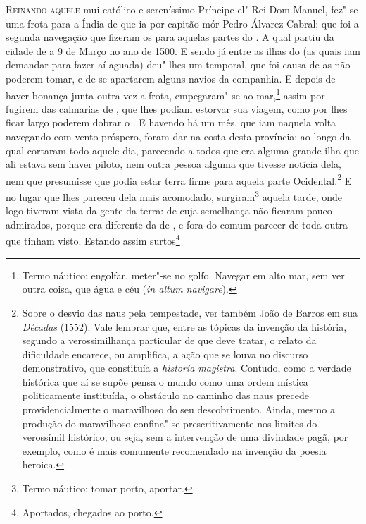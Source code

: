 \noindent\textsc{Reinando aquele} mui católico e sereníssimo Príncipe el"-Rei Dom Manuel,     
fez"-se uma frota para a Índia de que ia por capitão mór Pedro Álvarez Cabral; 	        %
que foi a segunda navegação que fizeram os  para
aquelas partes do . A qual partiu da cidade de  a 9 de Março no
ano de 1500. E sendo já entre as ilhas do  (as quais iam
demandar para fazer aí aguada) deu"-lhes um temporal, que foi				%
causa de as não poderem tomar, e de se apartarem alguns navios da
companhia. E depois de haver bonança junta outra vez a frota,					
empegaram"-se ao mar,\footnote{ Termo náutico: engolfar,  meter"-se no
golfo. Navegar em alto mar, sem ver outra coisa, que água e céu
(\textit{in altum navigare}).} assim por fugirem das calmarias de ,		%
que lhes podiam estorvar sua viagem, como por lhes ficar largo poderem
dobrar o . E havendo há um mês, que iam naquela
volta navegando com vento próspero, foram dar na costa desta província;				%
ao longo da qual cortaram todo aquele dia, parecendo a todos que era
alguma grande ilha que ali estava sem haver piloto, nem outra pessoa
alguma que tivesse notícia dela, nem que presumisse que podia estar
terra firme para aquela parte Ocidental.\footnote{ Sobre o desvio das				%
naus pela tempestade, ver também João de Barros em sua \textit{Décadas}
(1552). Vale lembrar que, entre as tópicas da invenção da história,
segundo a verossimilhança particular de que deve tratar, o relato da
dificuldade encarece, ou amplifica, a ação que se louva no discurso
demonstrativo, que constituía a \textit{historia
magistra}. Contudo, como a verdade histórica que aí se supõe pensa o
mundo como uma ordem mística politicamente instituída, o obstáculo no
caminho das naus precede providencialmente o maravilhoso do seu
descobrimento. Ainda, mesmo a produção do maravilhoso confina"-se
prescritivamente nos limites do verossímil histórico, ou seja, sem a
intervenção de uma divindade pagã, por exemplo, como é mais comumente
recomendado na invenção da poesia heroica.} E no lugar que lhes pareceu
dela mais acomodado, surgiram\footnote{ Termo náutico: tomar porto,
aportar. } aquela tarde, onde logo tiveram vista da gente da terra: de
cuja semelhança não ficaram pouco admirados, porque era diferente da de
, e fora do comum parecer de toda outra que tinham visto.
Estando assim surtos\footnote{ Aportados, chegados ao porto.}
